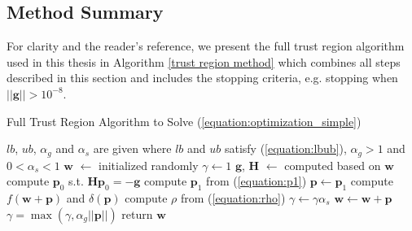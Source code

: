 \documentclass[letterpaper,12pt,titlepage,oneside,final]{book}
\begin{document}
	\subsection{Method Summary}
	For clarity and the reader's reference, we present the full trust region algorithm used in this thesis in Algorithm \ref{trust region method} which combines all steps described in this section and includes the stopping criteria, e.g. stopping when $||\mathbf{g}|| > 10^{-8}$.
	\begin{algorithm}
		\caption{Full Trust Region Algorithm to Solve (\ref{equation:optimization_simple})}\label{trust region method}
		\begin{algorithmic}[1]
			\State $lb$, $ub$, $\alpha_{g}$ and $\alpha_{s}$ are given where $lb$ and $ub$ satisfy (\ref{equation:lbub}), $\alpha_{g} > 1$ and $0 < \alpha_{s} < 1$
			\State $\mathbf{w}$ $\gets$ initialized randomly 
			\State $\gamma \gets 1$
			\State $\mathbf{g}$, $\mathbf{H}$ $\gets$ computed based on $\mathbf{w}$
			\State compute $\mathbf{p}_{0}$ s.t. $\mathbf{Hp}_{0} = -\mathbf{g}$
			\EndIf
			\State compute $\mathbf{p}_{1}$ from (\ref{equation:p1}) 
			\Else {}
			\State $\mathbf{p} \gets \mathbf{p}_{1}$
			\EndIf 
			\State compute $f(\mathbf{w} + \mathbf{p})$ and $\delta(\mathbf{p})$ 
			\State compute $\rho$ from (\ref{equation:rho})
			\State $\gamma \gets \gamma\alpha_{s}$
			\Else{}
			\State $\mathbf{w} \gets \mathbf{w} + \mathbf{p} $
			\State $\gamma = \max(\gamma,\alpha_{g}||\mathbf{p}||)$
			\EndIf
			\EndIf
			\EndWhile
			\State return $\mathbf{w}$
		\end{algorithmic}
	\end{algorithm}
	
	
\end{document}
